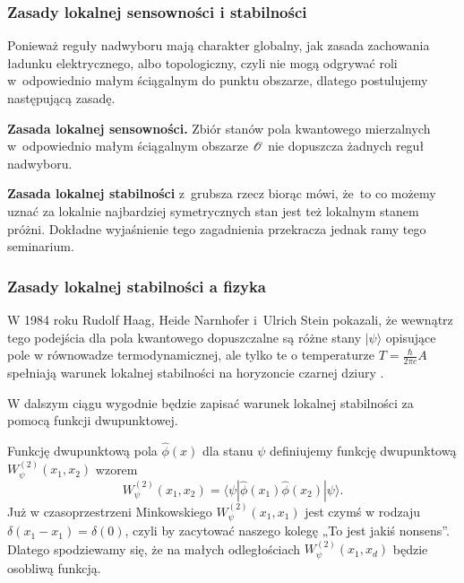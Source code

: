 \documentclass[10pt,t]{beamer}
\begin{document}
\begin{frame}
  \frametitle{Zasady lokalnej sensowności i stabilności}


  Ponieważ reguły nadwyboru mają charakter globalny, jak zasada
  zachowania ładunku elektrycznego, albo topologiczny, czyli nie mogą
  odgrywać roli w~odpowiednio małym ściągalnym do punktu obszarze,
  dlatego postulujemy następującą zasadę.

  \textbf{Zasada lokalnej sensowności.} Zbiór stanów pola kwantowego
  mierzalnych w~odpowiednio małym ściągalnym obszarze $\mathcal{O}$
  nie dopuszcza żadnych reguł nadwyboru.

  \textbf{Zasada lokalnej stabilności} z~grubsza rzecz biorąc mówi,
  że~to co możemy uznać za lokalnie najbardziej symetrycznych stan jest
  też lokalnym stanem próżni. Dokładne wyjaśnienie tego zagadnienia
  przekracza jednak ramy tego seminarium.

\end{frame}





\begin{frame}
  \frametitle{Zasady lokalnej stabilności a fizyka}


  W 1984 roku Rudolf Haag, Heide Narnhofer i~Ulrich Stein pokazali, że
  wewnątrz tego podejścia dla pola kwantowego dopuszczalne są różne
  stany $| \psi \rangle$ opisujące pole w równowadze termodynamicznej,
  ale tylko te o temperaturze $T = \frac{ \hbar }{ 2\pi c } A$
  spełniają warunek lokalnej stabilności na horyzoncie czarnej dziury
  \cite{FredenhagenHaagDerivationOfHawkingRadiation1990}.

  W dalszym ciągu wygodnie będzie zapisać warunek lokalnej stabilności
  za pomocą funkcji dwupunktowej.

  Funkcję dwupunktową pola $\widehat{ \phi }( x )$ dla stanu $\psi$
  definiujemy funkcję dwupunktową
  $W^{ ( 2 ) }_{ \psi }( x_{ 1 }, x_{ 2 } )$ wzorem
  \begin{equation}
    \label{eq:Promieniowanie-Hawkinga-16}
    W^{ ( 2 ) }_{ \psi }( x_{ 1 }, x_{ 2 } ) =
    \langle \psi | \widehat{ \phi }( x_{ 1 } ) \widehat{ \phi }( x_{ 2 } ) | \psi \rangle.
  \end{equation}
  Już w czasoprzestrzeni Minkowskiego
  $W^{ ( 2 ) }_{ \psi }( x_{ 1 }, x_{ 1 } )$ jest czymś w rodzaju
  $\delta( x_{ 1 } - x_{ 1 } ) = \delta( 0 )$, czyli by zacytować
  naszego kolegę „To jest jakiś nonsens”. Dlatego spodziewamy się, że
  na małych odległościach $W^{ ( 2 ) }_{ \psi }( x_{ 1 }, x_{ d } )$
  będzie osobliwą funkcją.

\end{frame}
\end{document}
